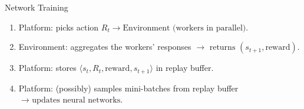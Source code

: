 \documentclass[aspectratio=169,xcolor=dvipsnames]{beamer}
\begin{document}
\begin{frame}[fragile]{Network Training}
    \footnotesize %
    \begin{enumerate}[<+-| alert@+>]

        \setlength{\itemsep}{1em} %
        
        \item Platform: picks action \( R_t \rightarrow \text{Environment (workers in parallel)} \).
        
        \item Environment: aggregates the workers’ responses  
        \(
        \rightarrow \text{ returns } (s_{t+1}, \text{reward}).
        \)

        \item Platform: stores \( \langle s_t, R_t, \text{reward}, s_{t+1} \rangle \) in replay buffer.
        
        \item Platform: (possibly) samples mini-batches from replay buffer  
        \(
        \rightarrow \text{ updates neural networks.}
        \)

    \end{enumerate}
\end{frame}


\end{document}
